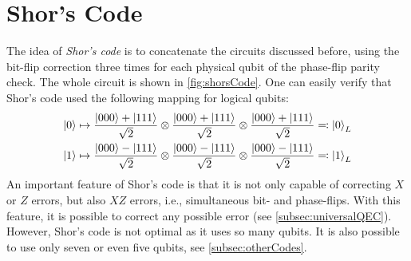 	\section{Shor's Code}
		The idea of \emph{Shor's code} is to concatenate the circuits discussed before, using the bit-flip correction three times for each physical qubit of the phase-flip parity check. The whole circuit is shown in \autoref{fig:shorsCode}. One can easily verify that Shor's code used the following mapping for logical qubits:
		\begin{equation}
			\begin{aligned}
				\ket{0} &\mapsto \frac{\ket{000} + \ket{111}}{\sqrt{2}} \otimes \frac{\ket{000} + \ket{111}}{\sqrt{2}} \otimes \frac{\ket{000} + \ket{111}}{\sqrt{2}} \eqqcolon \ket{0}_L \\
				\ket{1} &\mapsto \frac{\ket{000} - \ket{111}}{\sqrt{2}} \otimes \frac{\ket{000} - \ket{111}}{\sqrt{2}} \otimes \frac{\ket{000} - \ket{111}}{\sqrt{2}} \eqqcolon \ket{1}_L
			\end{aligned}
			\label{eq:shorCode}
		\end{equation}
		An important feature of Shor's code is that it is not only capable of correcting \(X\) or \(Z\) errors, but also \(XZ\) errors, i.e., simultaneous bit- and phase-flips. With this feature, it is possible to correct any possible error (see \autoref{subsec:universalQEC}). However, Shor's code is not optimal as it uses so many qubits. It is also possible to use only seven or even five qubits, see \autoref{subsec:otherCodes}.

